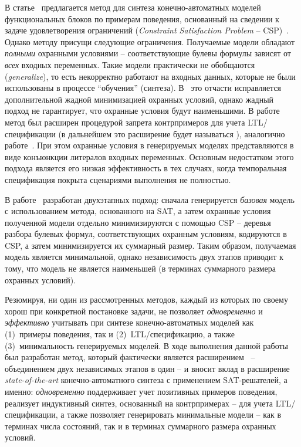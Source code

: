 В статье~\cite{fbCSP} предлагается метод  для синтеза конечно-автоматных моделей функциональных блоков по примерам поведения, основанный на сведении к задаче удовлетворения ограничений (\textit{Constraint Satisfaction Problem} \--- CSP)~\cite{montanari1974}.
Однако методу  присущи следующие ограничения.
Получаемые модели обладают \textit{полными} охранными условиями \--- соответствующие булевы формулы зависят от \textit{всех} входных переменных.
Такие модели практически не обобщаются (\textit{generalize}), то есть некорректно работают на входных данных, которые не были использованы в процессе \enquote{обучения} (синтеза).
В~\cite{fbCSP} это отчасти исправляется дополнительной жадной минимизацией охранных условий, однако жадный подход не гарантирует, что охранные условия будут наименьшими.
В работе~\cite{chivilikhin-18} метод  был расширен процедурой запрета контрпримеров для учета LTL\-/спецификации (в дальнейшем это расширение будет называться ), аналогично работе~\cite{efsm-tools}.
При этом охранные условия в генерируемых моделях представляются в виде конъюнкции литералов входных переменных.
Основным недостатком этого подхода является его низкая эффективность в тех случаях, когда темпоральная спецификация покрыта сценариями выполнения не полностью.

В работе~\cite{chivilikhin-19} разработан двухэтапных подход:
сначала генерируется \textit{базовая} модель с использованием метода, основанного на SAT, а затем охранные условия полученной модели отдельно минимизируются с помощью CSP \--- деревья разбора булевых формул, соответствующих охранным условиям, кодируются в CSP, а затем минимизируется их суммарный размер.
Таким образом, получаемая модель является минимальной, однако независимость двух этапов приводит к тому, что модель не является наименьшей (в терминах суммарного размера охранных условий).

Резюмируя, ни один из рассмотренных методов, каждый из которых по своему хорош при конкретной постановке задачи, не позволяет \textit{одновременно} и \textit{эффективно} учитывать при синтезе конечно-автоматных моделей как (1)~примеры поведения, так и (2)~LTL\-/спецификацию, а также (3)~минимальность генерируемых моделей.
В ходе выполнения данной работы был разработан метод, который фактически является расширением~\cite{chivilikhin-19} \--- объединением двух независимых этапов в один \--- и вносит вклад в расширение \textit{state-of-the-art} конечно-автоматного синтеза с применением SAT-решателей, а именно: \textit{одновременно} поддерживает учет позитивных примеров поведения, реализует индуктивный синтез, основанный на контрпримерах \--- для учета LTL\-/спецификации, а также позволяет генерировать минимальные модели \--- как в терминах числа состояний, так и в терминах суммарного размера охранных условий.

